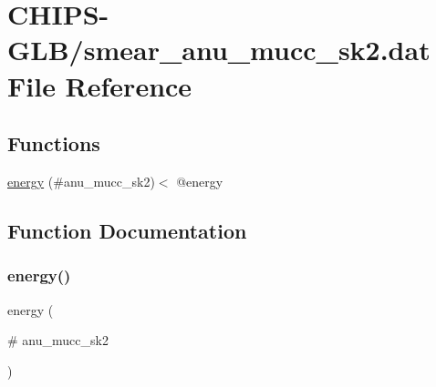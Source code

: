\hypertarget{smear__anu__mucc__sk2_8dat}{}\section{C\+H\+I\+P\+S-\/\+G\+L\+B/smear\+\_\+anu\+\_\+mucc\+\_\+sk2.dat File Reference}
\label{smear__anu__mucc__sk2_8dat}
\subsection*{Functions}
\begin{DoxyCompactItemize}
\item 
\hyperlink{smear__anu__mucc__sk2_8dat_a5cb1fe646f3ef168bfb45226fcbb8f71}{energy} (\#anu\+\_\+mucc\+\_\+sk2)$<$ @energy
\end{DoxyCompactItemize}


\subsection{Function Documentation}
\mbox{\label{smear__anu__mucc__sk2_8dat_a5cb1fe646f3ef168bfb45226fcbb8f71}} 
\subsubsection{\texorpdfstring{energy()}{energy()}}
{\footnotesize\ttfamily energy (\begin{DoxyParamCaption}\item[{\#}]{anu\+\_\+mucc\+\_\+sk2 }\end{DoxyParamCaption})}

